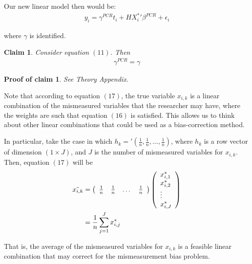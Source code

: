 \documentclass[10pt]{article}
\newtheorem{claim}{Claim}
\newtheorem{claimproof}{Proof of claim}[claim]
\begin{document}
        Our new linear model then would be:
        \begin{align}
            y_i = \gamma^{PCR} t_i + H{X^*_i}'\beta^{PCR} + \epsilon_i
        \end{align}
        
        where $\gamma$ is identified.

        \begin{claim}
        Consider equation $(11)$. Then
            \begin{align}
                {\gamma}^{PCR} = \gamma
            \end{align}
        \end{claim}

        \begin{claimproof}
            See Theory Appendix.
        \end{claimproof}
        
        Note that according to equation $(17)$, the true variable $x_{i,k}$ is a linear combination of the mismeasured variables that the researcher may have, where the weights are such that equation $(16)$ is satisfied. This allows us to think about other linear combinations that could be used as a bias-correction method. 
        
        In particular, take the case in which $h_k='(\frac{1}{n},\frac{1}{n},\dots,\frac{1}{n})$, where $h_k$ is a row vector of dimension $(1\times J)$, and $J$ is the number of mismeasured variables for $x_{i,k}$. Then, equation $(17)$ will be
        \begin{align}
            \Tilde{x_{i,k}}&=\left(\begin{array}{cccc}
            \frac{1}{n} & \frac{1}{n} & \dots &\frac{1}{n} 
            \end{array}\right)\left(\begin{array}{l}
            x^*_{i,1} \\
            x^*_{i,2} \\
            \vdots \\
            x^*_{i,J} 
            \end{array}\right)\\
            &=\frac{1}{n}\sum_{j=1}^J x^*_{i,j}
        \end{align}
        
        That is, the average of the mismeasured variables for $x_{i,k}$ is a feasible linear combination that may correct for the mismeasurement bias problem.
\end{document}
